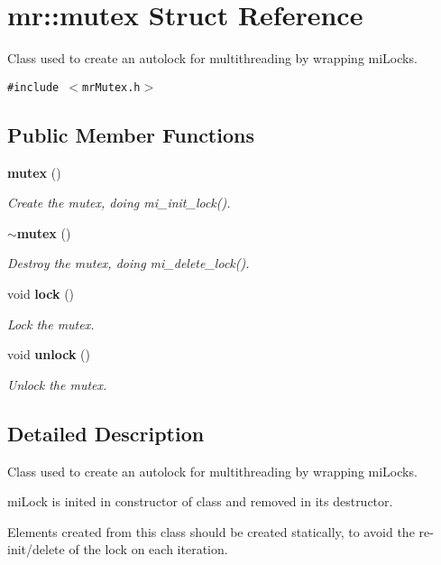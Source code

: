 \section{mr::mutex Struct Reference}
\label{structmr_1_1mutex}
Class used to create an autolock for multithreading by wrapping mi\-Locks.  


{\tt \#include $<$mr\-Mutex.h$>$}

\subsection*{Public Member Functions}
\begin{CompactItemize}
\item 
{\bf mutex} ()
\begin{CompactList}\small\item\em Create the mutex, doing mi\_\-init\_\-lock(). \item\end{CompactList}\item 
{\bf $\sim$mutex} ()
\begin{CompactList}\small\item\em Destroy the mutex, doing mi\_\-delete\_\-lock(). \item\end{CompactList}\item 
void {\bf lock} ()
\begin{CompactList}\small\item\em Lock the mutex. \item\end{CompactList}\item 
void {\bf unlock} ()
\begin{CompactList}\small\item\em Unlock the mutex. \item\end{CompactList}\end{CompactItemize}


\subsection{Detailed Description}
Class used to create an autolock for multithreading by wrapping mi\-Locks. 

mi\-Lock is inited in constructor of class and removed in its destructor.

Elements created from this class should be created statically, to avoid the re-init/delete of the lock on each iteration.

